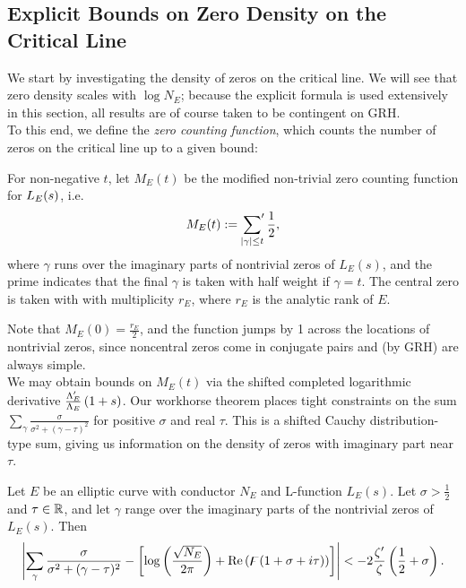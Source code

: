 \subsection{Explicit Bounds on Zero Density on the Critical Line}

We start by investigating the density of zeros on the critical line. We will see that zero density scales with $\log N_E$; because the explicit formula is used extensively in this section, all results are of course taken to be contingent on GRH. \\

To this end, we define the {\it zero counting function}, which counts the number of zeros on the critical line up to a given bound:
\begin{definition}\label{defn:zero_counting_function}
For non-negative $t$, let $M_E(t)$ be the modified non-trivial zero counting function for $L_E(s)$, i.e.
\begin{equation}
M_E(t) := \sideset{}{^{\prime}}\sum_{|\gamma| \le t} \frac{1}{2},
\end{equation}
where $\gamma$ runs over the imaginary parts of nontrivial zeros of $L_E(s)$, and the prime indicates that the final $\gamma$ is taken with half weight if $\gamma = t$. The central zero is taken with with multiplicity $r_E$, where $r_E$ is the analytic rank of $E$.
\end{definition}

Note that $M_E(0) = \frac{r_E}{2}$, and the function jumps by 1 across the locations of nontrivial zeros, since noncentral zeros come in conjugate pairs and (by GRH) are always simple. \\

%

We may obtain bounds on $M_E(t)$ via the shifted completed logarithmic derivative $\frac{\Lambda_E^{\prime}}{\Lambda_E}\left(1+s\right)$. Our workhorse theorem places tight constraints on the sum $\sum_\gamma \frac{\sigma}{\sigma^2+(\gamma-\tau)^2}$ for positive $\sigma$ and real $\tau$. This is a shifted Cauchy distribution-type sum, giving us information on the density of zeros with imaginary part near $\tau$.
\begin{theorem}[GRH]
\label{thm:poisson_sum_bound}
Let $E$ be an elliptic curve with conductor $N_E$ and L-function $L_E(s)$. Let $\sigma > \frac{1}{2}$ and $\tau \in \mathbb{R}$, and let $\gamma$ range over the imaginary parts of the nontrivial zeros of $L_E(s)$. Then
\begin{equation}
 \left| \sum_\gamma \frac{\sigma}{\sigma^2+(\gamma-\tau)^2} - \left[\log\left(\frac{\sqrt{N_E}}{2\pi}\right) + \mbox{\rm Re}\left(\digamma(1+\sigma+i \tau)\right)\right] \right| < - 2\frac{\zeta^{\prime}}{\zeta}\left(\frac{1}{2}+\sigma\right).
\end{equation}
\end{theorem}

